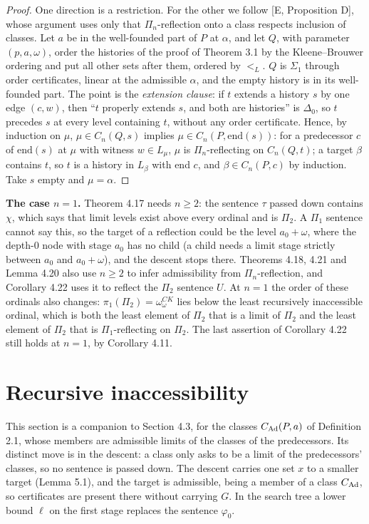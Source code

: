 \documentclass[11pt]{article}
\begin{document}
\begin{proof}
One direction is a restriction. For the other we follow [E, Proposition D], whose argument uses only that
$\Pi_n$-reflection onto a class respects inclusion of classes. Let $a$ be in the well-founded part of $P$ at $\alpha$,
and let $Q$, with parameter $(p, a, \omega)$, order the histories of the proof of Theorem 3.1 by the Kleene--Brouwer
ordering and put all other sets after them, ordered by $<_L$. $Q$ is $\Sigma_1$ through order certificates, linear at
the admissible $\alpha$, and the empty history is in its well-founded part. The point is the \emph{extension clause}:
if $t$ extends a history $s$ by one edge $(c, w)$, then ``$t$ properly extends $s$, and both are histories'' is
$\Delta_0$, so $t$ precedes $s$ at every level containing $t$, without any order certificate. Hence, by induction on
$\mu$, $\mu \in C_n(Q,s)$ implies $\mu \in C_n(P, \mathrm{end}(s))$: for a predecessor $c$ of $\mathrm{end}(s)$ at $\mu$
with witness $w \in L_\mu$, $\mu$ is $\Pi_n$-reflecting on $C_n(Q,t)$; a target $\beta$ contains $t$, so $t$ is a
history in $L_\beta$ with end $c$, and $\beta \in C_n(P,c)$ by induction. Take $s$ empty and $\mu = \alpha$.
\end{proof}

\textbf{The case $n = 1$.} Theorem 4.17 needs $n \ge 2$: the sentence $\tau$ passed down contains $\chi$, which says
that limit levels exist above every ordinal and is $\Pi_2$. A $\Pi_1$ sentence cannot say this, so the target of a
reflection could be the level $a_0 + \omega$, where the depth-0 node with stage $a_0$ has no child (a child needs a limit
stage strictly between $a_0$ and $a_0 + \omega$), and the descent stops there. Theorems 4.18, 4.21 and Lemma 4.20 also
use $n \ge 2$ to infer admissibility from $\Pi_n$-reflection, and Corollary 4.22 uses it to reflect the $\Pi_2$
sentence $U$. At $n = 1$ the order of these ordinals also changes: $\pi_1(\Pi_2) = \omega_\omega^{CK}$ lies below the
least recursively inaccessible ordinal, which is both the least element of $\Pi_2$ that is a limit of $\Pi_2$ and the
least element of $\Pi_2$ that is $\Pi_1$-reflecting on $\Pi_2$. The last assertion of Corollary 4.22 still holds at $n = 1$,
by Corollary 4.11.

\section{Recursive inaccessibility}

This section is a companion to Section 4.3, for the classes $C_{\mathrm{Ad}}(P,a)$ of Definition 2.1, whose members are
admissible limits of the classes of the predecessors. Its distinct move is in the descent: a class only asks to be a
limit of the predecessors' classes, so no sentence is passed down. The descent carries one set $x$ to a smaller target
(Lemma 5.1), and the target is admissible, being a member of a class $C_{\mathrm{Ad}}$, so certificates are present there without
carrying $G$. In the search tree a lower bound $\ell$ on the first stage replaces the sentence $\varphi_0$.
\end{document}

